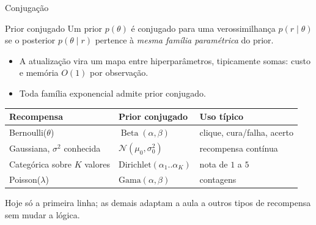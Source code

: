 \documentclass[aspectratio=169, 11pt]{beamer}
\newcommand{\Bdist}{\operatorname{Beta}}
\newcommand{\Nrm}{\mathcal{N}}
\begin{document}
\begin{frame}{Conjugação}
  \begin{defbox}{Prior conjugado}
    Um prior $p(\theta)$ é \alert{conjugado} para uma verossimilhança
    $p(r \mid \theta)$ se o posterior $p(\theta \mid r)$ pertence à
    \emph{mesma família paramétrica} do prior.
  \end{defbox}

  \begin{itemize}
    \item A atualização vira um mapa entre hiperparâmetros, tipicamente
          somas: custo e memória $O(1)$ por observação.
    \item Toda família exponencial admite prior conjugado.
  \end{itemize}

  \smallskip
  \begin{center}\scriptsize
  \begin{tabular}{@{}lll@{}}
    \toprule
    \textbf{Recompensa} & \textbf{Prior conjugado} & \textbf{Uso típico} \\
    \midrule
    Bernoulli($\theta$)            & $\Bdist(\alpha,\beta)$ & clique, cura/falha, acerto \\
    Gaussiana, $\sigma^2$ conhecida & $\Nrm(\mu_0,\sigma_0^2)$ & recompensa contínua \\
    Categórica sobre $K$ valores   & $\mathrm{Dirichlet}(\alpha_1..\alpha_K)$ & nota de $1$ a $5$ \\
    Poisson($\lambda$)             & $\mathrm{Gama}(\alpha,\beta)$ & contagens \\
    \bottomrule
  \end{tabular}
  \end{center}

  \smallskip
  {\small\color{rlCinza} Hoje só a primeira linha; as demais adaptam a aula
  a outros tipos de recompensa sem mudar a lógica.}
\end{frame}
\end{document}
